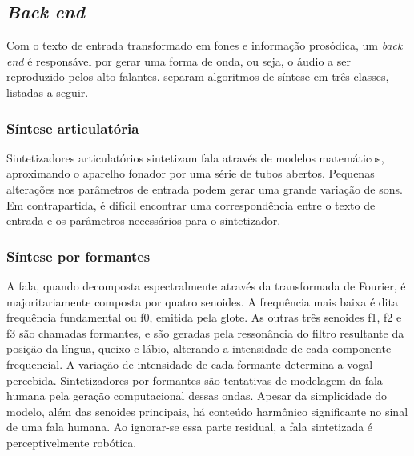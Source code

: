 
\subsection{\emph{Back end}}
\label{backend}
Com o texto de entrada transformado em fones e informação prosódica, um
\emph{back end} é responsável por gerar uma forma de onda, ou seja, o áudio a
ser reproduzido pelos alto-falantes.  separam
algoritmos de síntese em três classes, listadas a seguir.

\subsubsection{Síntese articulatória}
Sintetizadores articulatórios sintetizam fala através de modelos matemáticos,
aproximando o aparelho fonador por uma série de tubos abertos. Pequenas
alterações nos parâmetros de entrada podem gerar uma grande variação de sons. Em
contrapartida, é difícil encontrar uma correspondência entre o texto de entrada
e os parâmetros necessários para o sintetizador.

\subsubsection{Síntese por formantes}
\label{formant}
A fala, quando decomposta espectralmente através da transformada de Fourier, é
majoritariamente composta por quatro senoides. A frequência mais baixa é dita
frequência fundamental ou f0, emitida pela glote. As outras três senoides f1, f2
e f3 são chamadas formantes, e são geradas pela ressonância do filtro resultante
da posição da língua, queixo e lábio, alterando a intensidade de cada componente
frequencial. A variação de intensidade de cada formante determina a vogal
percebida. Sintetizadores por formantes são tentativas de modelagem da fala
humana pela geração computacional dessas ondas. Apesar da simplicidade do
modelo, além das senoides principais, há conteúdo harmônico significante no
sinal de uma fala humana. Ao ignorar-se essa parte residual, a fala sintetizada
é perceptivelmente robótica.


